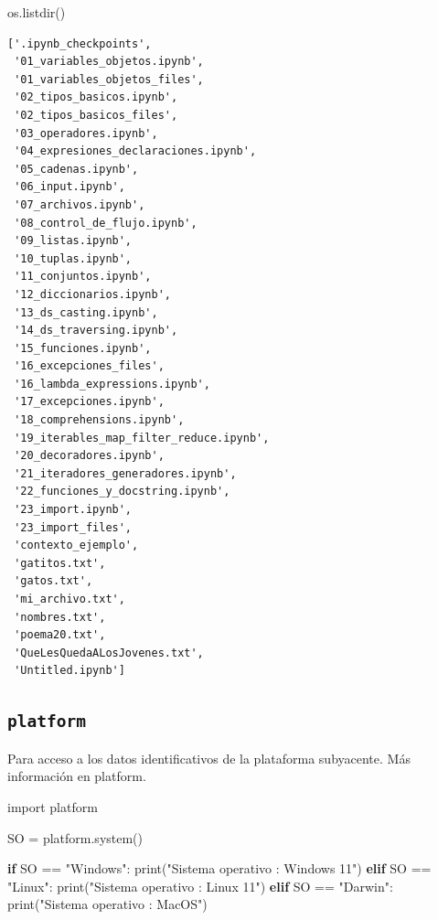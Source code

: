 \documentclass[
  spanish,
  letterpaper,
]{scrbook}
\newenvironment{Shaded}{\begin{snugshade}}{\end{snugshade}}
\newcommand{\BuiltInTok}[1]{\textcolor[rgb]{0.00,0.23,0.31}{#1}}
\newcommand{\ControlFlowTok}[1]{\textcolor[rgb]{0.00,0.23,0.31}{\textbf{#1}}}
\newcommand{\ImportTok}[1]{\textcolor[rgb]{0.00,0.46,0.62}{#1}}
\newcommand{\NormalTok}[1]{\textcolor[rgb]{0.00,0.23,0.31}{#1}}
\newcommand{\OperatorTok}[1]{\textcolor[rgb]{0.37,0.37,0.37}{#1}}
\newcommand{\StringTok}[1]{\textcolor[rgb]{0.13,0.47,0.30}{#1}}
\theoremstyle{definition}
\theoremstyle{remark}
\begin{document}
\begin{Shaded}
\begin{Highlighting}[]
\NormalTok{os.listdir()}
\end{Highlighting}
\end{Shaded}

\begin{verbatim}
['.ipynb_checkpoints',
 '01_variables_objetos.ipynb',
 '01_variables_objetos_files',
 '02_tipos_basicos.ipynb',
 '02_tipos_basicos_files',
 '03_operadores.ipynb',
 '04_expresiones_declaraciones.ipynb',
 '05_cadenas.ipynb',
 '06_input.ipynb',
 '07_archivos.ipynb',
 '08_control_de_flujo.ipynb',
 '09_listas.ipynb',
 '10_tuplas.ipynb',
 '11_conjuntos.ipynb',
 '12_diccionarios.ipynb',
 '13_ds_casting.ipynb',
 '14_ds_traversing.ipynb',
 '15_funciones.ipynb',
 '16_excepciones_files',
 '16_lambda_expressions.ipynb',
 '17_excepciones.ipynb',
 '18_comprehensions.ipynb',
 '19_iterables_map_filter_reduce.ipynb',
 '20_decoradores.ipynb',
 '21_iteradores_generadores.ipynb',
 '22_funciones_y_docstring.ipynb',
 '23_import.ipynb',
 '23_import_files',
 'contexto_ejemplo',
 'gatitos.txt',
 'gatos.txt',
 'mi_archivo.txt',
 'nombres.txt',
 'poema20.txt',
 'QueLesQuedaALosJovenes.txt',
 'Untitled.ipynb']
\end{verbatim}

\subsection{\texorpdfstring{\texttt{platform}}{platform}}\label{platform}

Para acceso a los datos identificativos de la plataforma subyacente. Más
información en platform.

\begin{Shaded}
\begin{Highlighting}[]
\ImportTok{import}\NormalTok{ platform}

\NormalTok{SO }\OperatorTok{=}\NormalTok{ platform.system()}

\ControlFlowTok{if}\NormalTok{ SO }\OperatorTok{==} \StringTok{"Windows"}\NormalTok{:}
    \BuiltInTok{print}\NormalTok{(}\StringTok{"Sistema operativo : Windows 11"}\NormalTok{)}
\ControlFlowTok{elif}\NormalTok{ SO }\OperatorTok{==} \StringTok{"Linux"}\NormalTok{:}
    \BuiltInTok{print}\NormalTok{(}\StringTok{"Sistema operativo : Linux 11"}\NormalTok{)}
\ControlFlowTok{elif}\NormalTok{ SO }\OperatorTok{==} \StringTok{"Darwin"}\NormalTok{:}
    \BuiltInTok{print}\NormalTok{(}\StringTok{"Sistema operativo : MacOS"}\NormalTok{)}
\end{Highlighting}
\end{Shaded}
\end{document}
